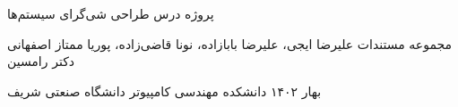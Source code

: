 \newcommand{\ThesisType}
‫{پروژه درس}
\newcommand{\ThesisDegree}
‫{طراحی شی‌گرای سیستم‌ها}

\newcommand{\ThesisTitle}
‫{مجموعه مستندات}
\newcommand{\ThesisAuthor}
‫{علیرضا ایجی، علیرضا بابا‌زاده، نونا قاضی‌زاده، پوریا ممتاز اصفهانی}
\newcommand{\ThesisSupervisor}
‫{دکتر رامسین}

\newcommand{\ThesisDate}
‫{بهار ۱۴۰۲}
\newcommand{\ThesisDepartment}
‫{دانشکده مهندسی کامپیوتر}
\newcommand{\ThesisUniversity}
‫{دانشگاه صنعتی شریف}
